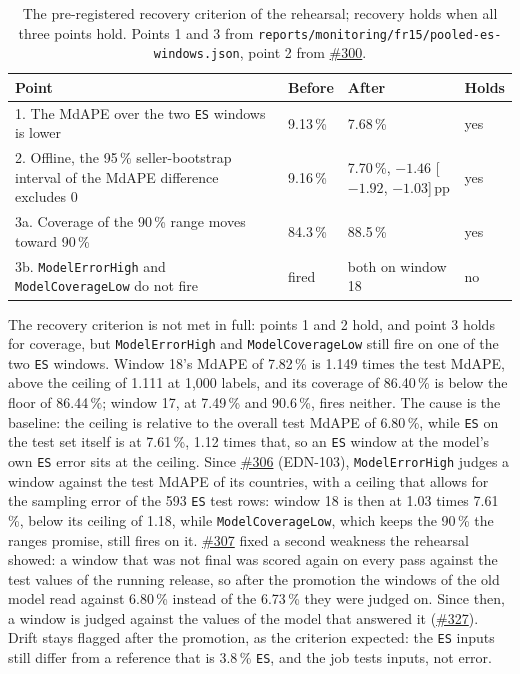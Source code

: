 \begin{table}[ht]
  \centering\small
  \begin{tabularx}{\textwidth}{@{}Xlll@{}}
    \toprule
    Point & Before & After & Holds \\
    \midrule
    1. The MdAPE over the two \texttt{ES} windows is lower & 9.13\,\% & 7.68\,\% & yes \\
    2. Offline, the 95\,\% seller-bootstrap interval of the MdAPE difference excludes 0 & 9.16\,\% & 7.70\,\%, $-1.46$ [$-1.92$, $-1.03$]\,pp & yes \\
    3a. Coverage of the 90\,\% range moves toward 90\,\% & 84.3\,\% & 88.5\,\% & yes \\
    3b. \texttt{ModelErrorHigh} and \texttt{ModelCoverageLow} do not fire & fired & both on window 18 & no \\
    \bottomrule
  \end{tabularx}
  \caption{The pre-registered recovery criterion of the rehearsal; recovery holds when all three points hold. Points 1 and 3 from \texttt{reports/monitoring/fr15/pooled-es-windows.json}, point 2 from \href{https://github.com/mlops-2627q1-mds-upc/MLOPS_Recommenditos/pull/300}{\#300}.}
  \label{tab:m6-recovery}
\end{table}

The recovery criterion is not met in full: points 1 and 2 hold, and point 3 holds for coverage, but \texttt{ModelErrorHigh} and \texttt{ModelCoverageLow} still fire on one of the two \texttt{ES} windows.
Window 18's MdAPE of 7.82\,\% is 1.149 times the test MdAPE, above the ceiling of 1.111 at 1,000 labels, and its coverage of 86.40\,\% is below the floor of 86.44\,\%; window 17, at 7.49\,\% and 90.6\,\%, fires neither.
The cause is the baseline: the ceiling is relative to the overall test MdAPE of 6.80\,\%, while \texttt{ES} on the test set itself is at 7.61\,\%, 1.12 times that, so an \texttt{ES} window at the model's own \texttt{ES} error sits at the ceiling.
Since \href{https://github.com/mlops-2627q1-mds-upc/MLOPS_Recommenditos/issues/306}{\#306} (EDN-103), \texttt{ModelErrorHigh} judges a window against the test MdAPE of its countries, with a ceiling that allows for the sampling error of the 593 \texttt{ES} test rows: window 18 is then at 1.03 times 7.61\,\%, below its ceiling of 1.18, while \texttt{ModelCoverageLow}, which keeps the 90\,\% the ranges promise, still fires on it.
\href{https://github.com/mlops-2627q1-mds-upc/MLOPS_Recommenditos/issues/307}{\#307} fixed a second weakness the rehearsal showed: a window that was not final was scored again on every pass against the test values of the running release, so after the promotion the windows of the old model read against 6.80\,\% instead of the 6.73\,\% they were judged on.
Since then, a window is judged against the values of the model that answered it (\href{https://github.com/mlops-2627q1-mds-upc/MLOPS_Recommenditos/pull/327}{\#327}).
Drift stays flagged after the promotion, as the criterion expected: the \texttt{ES} inputs still differ from a reference that is 3.8\,\% \texttt{ES}, and the job tests inputs, not error.
